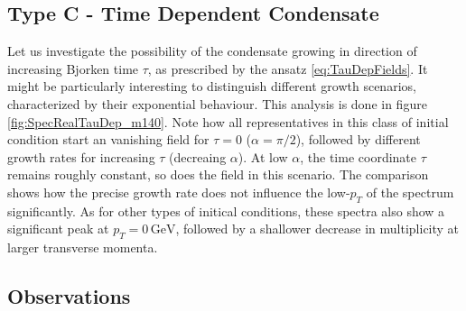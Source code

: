 \subsection{Type C - Time Dependent Condensate}

Let us investigate the possibility of the condensate growing in direction of increasing Bjorken time $\tau$, as prescribed by the ansatz \eqref{eq:TauDepFields}. It might be particularly interesting to distinguish different growth scenarios, characterized by their exponential behaviour. This analysis is done in figure \ref{fig:SpecRealTauDep_m140}. Note how all representatives in this class of initial condition start an vanishing field for ${\tau=0}$ ($\alpha=\pi/2$), followed by different growth rates for increasing $\tau$ (decreaing $\alpha$). At low $\alpha$, the time coordinate $\tau$ remains roughly constant, so does the field in this scenario. The comparison shows how the precise growth rate does not influence the low-$p_T$ of the spectrum significantly. As for other types of initical conditions, these spectra also show a significant peak at ${p_T=0\,\text{GeV}}$, followed by a shallower decrease in multiplicity at larger transverse momenta.


\subsection{Observations}


